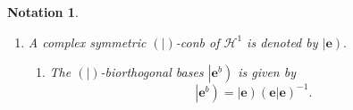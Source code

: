 \documentclass[aps,preprint]{revtex4}%
\newtheorem{notation}[theorem]{Notation}
\begin{document}
\begin{notation}
\begin{enumerate}
\begin{enumerate}
\item This gives%
\begin{align}
\mathbf{e}^{d}\left(  \mathbf{e}\right)   &  =\left(  \mathbf{e}^{d}\right)
^{t}\cdot\left(  \mathbf{e}\right)  =\left\langle \left.  \mathbf{e}%
^{b}\right\vert \mathbf{e}\right\rangle =\left\langle \mathbf{e}%
^{b}\right\vert \cdot\left\vert \mathbf{e}\right\rangle =\left(
\begin{array}
[c]{c}%
\left\langle e_{1}^{b}\right\vert \\
\vdots\\
\left\langle e_{r}^{b}\right\vert
\end{array}
\right)  \cdot\left(
\begin{array}
[c]{ccc}%
\left\vert e_{1}\right\rangle  & \cdots & \left\vert e_{r}\right\rangle
\end{array}
\right) \\
&  =\left\langle \left(  \mathbf{e}\right)  \left\langle \left.
\mathbf{e}\right\vert \mathbf{e}\right\rangle ^{-1}\right\vert \cdot\left\vert
\mathbf{e}\right\rangle =\left(  \left\langle \left.  \mathbf{e}\right\vert
\mathbf{e}\right\rangle ^{-1}\left\langle \mathbf{e}\right\vert \right)
\left\vert \mathbf{e}\right\rangle =\left\langle \left.  \mathbf{e}\right\vert
\mathbf{e}\right\rangle ^{-1}\left\langle \left.  \mathbf{e}\right\vert
\mathbf{e}\right\rangle =\mathbb{I}_{r}.
\end{align}

\end{enumerate}

\item A complex symmetric $\left(  \left.  {}\right\vert \right)  $-conb of
$\mathcal{H}^{1}$ is denoted by $\left\vert \mathbf{e}\right)  .$

\begin{enumerate}
\item The $\left(  \left.  {}\right\vert \right)  $-biorthogonal bases
$\left\vert \mathbf{e}^{b}\right)  $ is given by
\begin{equation}
\left\vert \mathbf{e}^{b}\right)  =\left\vert \mathbf{e}\right)  \left(
\left.  \mathbf{e}\right\vert \mathbf{e}\right)  ^{-1}.
\end{equation}



\end{enumerate}
\end{enumerate}
\end{notation}
\end{document}
